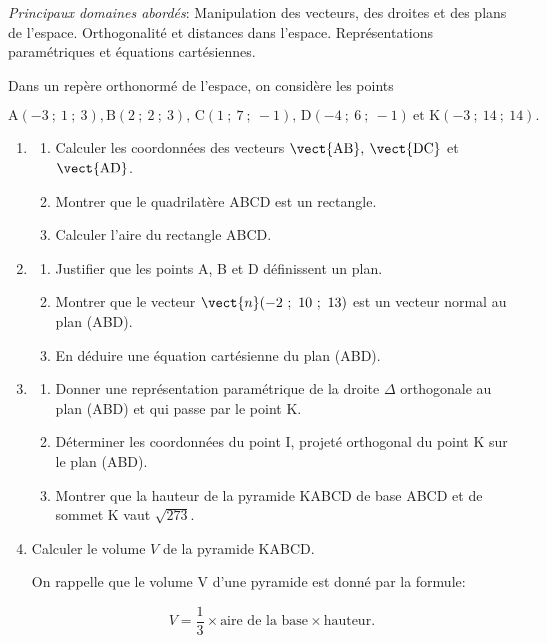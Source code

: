 \medskip

\emph{Principaux domaines abordés}: Manipulation des vecteurs, des droites et des plans de l'espace. Orthogonalité et distances dans l'espace.
Représentations paramétriques et équations cartésiennes.

\bigskip

Dans un repère orthonormé \Oijk{} de l'espace,
on considère les points 

\[\text{A}(-3~;~1~;~3), \text{B}(2~;~2~;~3),\, \text{C}(1~;~7~;~-1), \,\text{D}(-4~;~6~;~-1)\: \text{et 
K}(-3~;~14~;~14).\]

\medskip

\begin{enumerate}
\item 
	\begin{enumerate}
		\item Calculer les coordonnées des vecteurs $\vect{\text{AB}},\: \vect{\text{DC}}$ et 
		$\vect{\text{AD}}$.
		\item Montrer que le quadrilatère ABCD est un rectangle.
		\item Calculer l'aire du rectangle ABCD.
	\end{enumerate}
\item 
	\begin{enumerate}
		\item Justifier que les points A, B et D définissent un plan.
		\item Montrer que le vecteur $\vect{n}(-2~;~10~;~13)$ est un vecteur normal au plan (ABD). 
		\item  En déduire une équation cartésienne du plan (ABD).
	\end{enumerate}
\item
	\begin{enumerate}
		\item Donner une représentation paramétrique de la droite $\Delta$ orthogonale au plan (ABD) et qui passe par le point K.
		\item Déterminer les coordonnées du point I, projeté orthogonal du point K sur le plan (ABD).
		\item Montrer que la hauteur de la pyramide KABCD de base ABCD et de sommet K
vaut $\sqrt{273}$.
	\end{enumerate}
\item Calculer le volume $V$ de la pyramide KABCD.

On rappelle que le volume V d'une pyramide est donné par la formule:

\[V= \dfrac13 \times \text{aire de la base} \times \text{hauteur}.\]
\end{enumerate}
